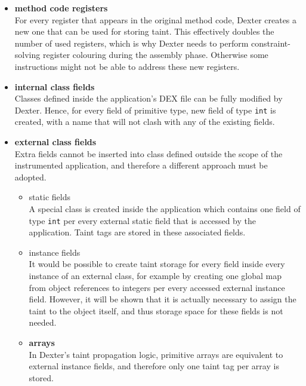 \documentclass[12pt,twoside,notitlepage]{report}
\begin{document}
\begin{itemize}

\item \textbf{method code registers} \\
For every register that appears in the original method code, Dexter creates a new one that can be used for storing taint. This effectively doubles the number of used registers, which is why Dexter needs to perform constraint-solving register colouring during the assembly phase. Otherwise some instructions might not be able to address these new registers.

\item \textbf{internal class fields} \\
Classes defined inside the application's DEX file can be fully modified by Dexter. Hence, for every field of primitive type, new field of type \verb$int$ is created, with a name that will not clash with any of the existing fields.

\item \textbf{external class fields} \\
Extra fields cannot be inserted into class defined outside the scope of the instrumented application, and therefore a different approach must be adopted. 
\begin{itemize}
\item static fields \\
A special class is created inside the application which contains one field of type \verb$int$ per every external static field that is accessed by the application. Taint tags are stored in these associated fields.

\item instance fields \\
It would be possible to create taint storage for every field inside every instance of an external class, for example by creating one global map from object references to integers per every accessed external instance field. However, it will be shown that it is actually necessary to assign the taint to the object itself, and thus storage space for these fields is not needed.

\item \textbf{arrays} \\
In Dexter's taint propagation logic, primitive arrays are equivalent to external instance fields, and therefore only one taint tag per array is stored.

\end{itemize}

\end{itemize}
\end{document}
